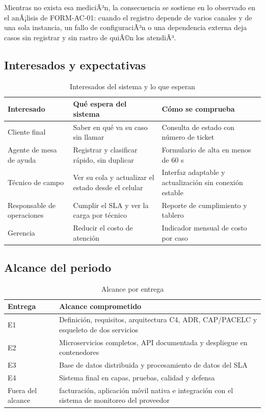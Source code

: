 Mientras no exista esa mediciÃ³n, la consecuencia se sostiene en lo observado en el anÃ¡lisis de
FORM-AC-01: cuando el registro depende de varios canales y de una sola instancia, un fallo de
configuraciÃ³n o una dependencia externa deja casos sin registrar y sin rastro de quiÃ©n los atendiÃ³.

\subsection{Interesados y expectativas}

\begin{table}[H]
\centering
\caption{Interesados del sistema y lo que esperan}
\label{tab:stakeholders}
\small
\begin{tabularx}{\linewidth}{@{}lYY@{}}
\toprule
Interesado & Qué espera del sistema & Cómo se comprueba \\
\midrule
Cliente final & Saber en qué va su caso sin llamar & Consulta de estado con número de ticket \\
Agente de mesa de ayuda & Registrar y clasificar rápido, sin duplicar & Formulario de alta en menos de 60 s \\
Técnico de campo & Ver su cola y actualizar el estado desde el celular & Interfaz adaptable y actualización sin conexión estable \\
Responsable de operaciones & Cumplir el SLA y ver la carga por técnico & Reporte de cumplimiento y tablero \\
Gerencia & Reducir el costo de atención & Indicador mensual de costo por caso \\
\bottomrule
\end{tabularx}
\end{table}

\subsection{Alcance del periodo}

\begin{table}[H]
\centering
\caption{Alcance por entrega}
\small
\begin{tabularx}{\linewidth}{@{}lY@{}}
\toprule
Entrega & Alcance comprometido \\
\midrule
E1 & Definición, requisitos, arquitectura C4, ADR, CAP/PACELC y esqueleto de dos servicios \\
E2 & Microservicios completos, API documentada y despliegue en contenedores \\
E3 & Base de datos distribuida y procesamiento de datos del SLA \\
E4 & Sistema final en capas, pruebas, calidad y defensa \\
\midrule
Fuera del alcance & facturación, aplicación móvil nativa e integración con el sistema de monitoreo del proveedor \\
\bottomrule
\end{tabularx}
\end{table}

